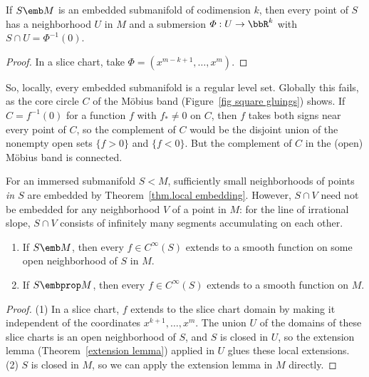 \begin{prop}\label{prop local defining functions}
    If $S\emb M$ is an embedded submanifold of codimension $k$, then every point of $S$ has a neighborhood $U$ in $M$ and a submersion $\varPhi:U\to\bbR^k$ with $S\cap U=\varPhi^{-1}(0)$.
\end{prop}
\begin{proof}
    In a slice chart, take $\varPhi=(x^{m-k+1},\ldots,x^m)$.
\end{proof}
So, locally, every embedded submanifold is a regular level set. Globally this fails, as the core circle $C$ of the M\"obius band (Figure~\ref{fig square gluings}) shows. If $C=f^{-1}(0)$ for a function $f$ with $f_{\ast}\neq0$ on $C$, then $f$ takes both signs near every point of $C$, so the complement of $C$ would be the disjoint union of the nonempty open sets $\{f>0\}$ and $\{f<0\}$. But the complement of $C$ in the (open) M\"obius band is connected.

For an immersed submanifold $S<M$, sufficiently small neighborhoods of points \emph{in $S$} are embedded by Theorem~\ref{thm.local embedding}. However, $S\cap V$ need not be embedded for any neighborhood $V$ of a point in $M$: for the line of irrational slope, $S\cap V$ consists of infinitely many segments accumulating on each other.

\begin{thm}\label{thm extension from submanifolds}
    \begin{enumerate}
        \item If $S\emb M$, then every $f\in C^\infty(S)$ extends to a smooth function on some open neighborhood of $S$ in $M$.
        \item If $S\embprop M$, then every $f\in C^\infty(S)$ extends to a smooth function on $M$.
    \end{enumerate}
\end{thm}
\begin{proof}
    (1) In a slice chart, $f$ extends to the slice chart domain by making it independent of the coordinates $x^{k+1},\ldots,x^m$. The union $U$ of the domains of these slice charts is an open neighborhood of $S$, and $S$ is closed in $U$, so the extension lemma (Theorem~\ref{extension lemma}) applied in $U$ glues these local extensions. (2) $S$ is closed in $M$, so we can apply the extension lemma in $M$ directly.
\end{proof}

